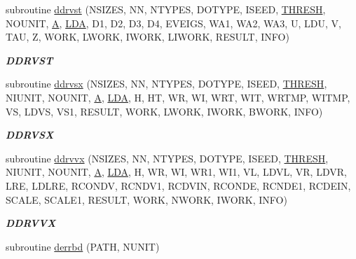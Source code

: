 \begin{DoxyCompactItemize}
subroutine \hyperlink{group__double__eig_ga47fc55396c12e72375ade9b3b3fefc79}{ddrvst} (N\+S\+I\+Z\+E\+S, N\+N, N\+T\+Y\+P\+E\+S, D\+O\+T\+Y\+P\+E, I\+S\+E\+E\+D, \hyperlink{zlaqgs_8c_a0656018abfc9fa2821827415f5d5ea57}{T\+H\+R\+E\+S\+H}, N\+O\+U\+N\+I\+T, \hyperlink{classA}{A}, \hyperlink{example__user_8c_ae946da542ce0db94dced19b2ecefd1aa}{L\+D\+A}, D1, D2, D3, D4, E\+V\+E\+I\+G\+S, W\+A1, W\+A2, W\+A3, U, L\+D\+U, V, T\+A\+U, Z, W\+O\+R\+K, L\+W\+O\+R\+K, I\+W\+O\+R\+K, L\+I\+W\+O\+R\+K, R\+E\+S\+U\+L\+T, I\+N\+F\+O)
\begin{DoxyCompactList}\small\item\em {\bfseries D\+D\+R\+V\+S\+T} \end{DoxyCompactList}\item 
subroutine \hyperlink{group__double__eig_ga35b419f2aaa6ac71abbaa387a29e5ee6}{ddrvsx} (N\+S\+I\+Z\+E\+S, N\+N, N\+T\+Y\+P\+E\+S, D\+O\+T\+Y\+P\+E, I\+S\+E\+E\+D, \hyperlink{zlaqgs_8c_a0656018abfc9fa2821827415f5d5ea57}{T\+H\+R\+E\+S\+H}, N\+I\+U\+N\+I\+T, N\+O\+U\+N\+I\+T, \hyperlink{classA}{A}, \hyperlink{example__user_8c_ae946da542ce0db94dced19b2ecefd1aa}{L\+D\+A}, H, H\+T, W\+R, W\+I, W\+R\+T, W\+I\+T, W\+R\+T\+M\+P, W\+I\+T\+M\+P, V\+S, L\+D\+V\+S, V\+S1, R\+E\+S\+U\+L\+T, W\+O\+R\+K, L\+W\+O\+R\+K, I\+W\+O\+R\+K, B\+W\+O\+R\+K, I\+N\+F\+O)
\begin{DoxyCompactList}\small\item\em {\bfseries D\+D\+R\+V\+S\+X} \end{DoxyCompactList}\item 
subroutine \hyperlink{group__double__eig_ga4db8108d75a2a49d865e766418fa0726}{ddrvvx} (N\+S\+I\+Z\+E\+S, N\+N, N\+T\+Y\+P\+E\+S, D\+O\+T\+Y\+P\+E, I\+S\+E\+E\+D, \hyperlink{zlaqgs_8c_a0656018abfc9fa2821827415f5d5ea57}{T\+H\+R\+E\+S\+H}, N\+I\+U\+N\+I\+T, N\+O\+U\+N\+I\+T, \hyperlink{classA}{A}, \hyperlink{example__user_8c_ae946da542ce0db94dced19b2ecefd1aa}{L\+D\+A}, H, W\+R, W\+I, W\+R1, W\+I1, V\+L, L\+D\+V\+L, V\+R, L\+D\+V\+R, L\+R\+E, L\+D\+L\+R\+E, R\+C\+O\+N\+D\+V, R\+C\+N\+D\+V1, R\+C\+D\+V\+I\+N, R\+C\+O\+N\+D\+E, R\+C\+N\+D\+E1, R\+C\+D\+E\+I\+N, S\+C\+A\+L\+E, S\+C\+A\+L\+E1, R\+E\+S\+U\+L\+T, W\+O\+R\+K, N\+W\+O\+R\+K, I\+W\+O\+R\+K, I\+N\+F\+O)
\begin{DoxyCompactList}\small\item\em {\bfseries D\+D\+R\+V\+V\+X} \end{DoxyCompactList}\item 
subroutine \hyperlink{group__double__eig_gad5e18a852c76f0b059ad31c83f06b8cc}{derrbd} (P\+A\+T\+H, N\+U\+N\+I\+T)

\end{DoxyCompactItemize}
